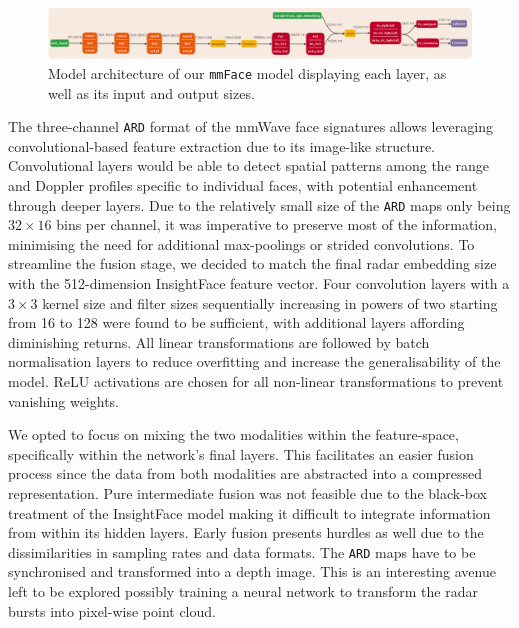 \documentclass{mpaper}
\begin{document}
\begin{figure}[h!]
    \centering
    \includegraphics[width=1.02\textwidth]{figures/model_architecture.png}
    \vspace{0.001cm}
    \caption{Model architecture of our \texttt{mmFace} model displaying each layer, as well as its input and output sizes.}
    \label{fig:model_architecture}
\end{figure}

The three-channel \texttt{ARD} format of the mmWave face signatures allows leveraging convolutional-based feature extraction due to its image-like structure. Convolutional layers would be able to detect spatial patterns among the range and Doppler profiles specific to individual faces, with potential enhancement through deeper layers. Due to the relatively small size of the \texttt{ARD} maps only being $32 \times 16$ bins per channel, it was imperative to preserve most of the information, minimising the need for additional max-poolings or strided convolutions. To streamline the fusion stage, we decided to match the final radar embedding size with the 512-dimension InsightFace feature vector. Four convolution layers with a $3 \times 3$ kernel size and filter sizes sequentially increasing in powers of two starting from 16 to 128 were found to be sufficient, with additional layers affording diminishing returns. All linear transformations are followed by batch normalisation layers to reduce overfitting and increase the generalisability of the model. ReLU activations are chosen for all non-linear transformations to prevent vanishing weights.

We opted to focus on mixing the two modalities within the feature-space, specifically within the network's final layers. This facilitates an easier fusion process since the data from both modalities are abstracted into a compressed representation. Pure intermediate fusion was not feasible due to the black-box treatment of the InsightFace model making it difficult to integrate information from within its hidden layers. Early fusion presents hurdles as well due to the dissimilarities in sampling rates and data formats. The \texttt{ARD} maps have to be synchronised and transformed into a depth image. This is an interesting avenue left to be explored possibly training a neural network to transform the radar bursts into pixel-wise point cloud.
\end{document}
